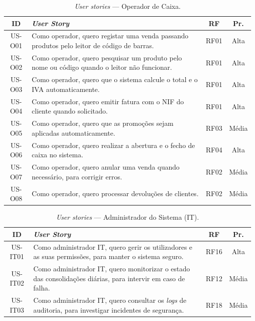    \begin{table}[H]
    \centering
    \small
    \begin{tabular}{|c|p{8.5cm}|c|c|}
    \hline
    \textbf{ID} & \textbf{\textit{User Story}} & \textbf{RF} & \textbf{Pr.} \\
    \hline
    US-O01 & Como operador, quero registar uma venda passando produtos pelo leitor de código de barras. & RF01 & Alta \\
    \hline
    US-O02 & Como operador, quero pesquisar um produto pelo nome ou código quando o leitor não funcionar. & RF01 & Alta \\
    \hline
    US-O03 & Como operador, quero que o sistema calcule o total e o IVA automaticamente. & RF01 & Alta \\
    \hline
    US-O04 & Como operador, quero emitir fatura com o NIF do cliente quando solicitado. & RF01 & Alta \\
    \hline
    US-O05 & Como operador, quero que as promoções sejam aplicadas automaticamente. & RF03 & Média \\
    \hline
    US-O06 & Como operador, quero realizar a abertura e o fecho de caixa no sistema. & RF04 & Alta \\
    \hline
    US-O07 & Como operador, quero anular uma venda quando necessário, para corrigir erros. & RF02 & Média \\
    \hline
    US-O08 & Como operador, quero processar devoluções de clientes. & RF02 & Média \\
    \hline
    \end{tabular}
    \caption{\textit{User stories} --- Operador de Caixa.}
    \label{tab:us_operador}
    \end{table}

    \begin{table}[H]
    \centering
    \small
    \begin{tabular}{|c|p{8.5cm}|c|c|}
    \hline
    \textbf{ID} & \textbf{\textit{User Story}} & \textbf{RF} & \textbf{Pr.} \\
    \hline
    US-IT01 & Como administrador IT, quero gerir os utilizadores e as suas permissões, para manter o sistema seguro. & RF16 & Alta \\
    \hline
    US-IT02 & Como administrador IT, quero monitorizar o estado das consolidações diárias, para intervir em caso de falha. & RF12 & Média \\
    \hline
    US-IT03 & Como administrador IT, quero consultar os \textit{logs} de auditoria, para investigar incidentes de segurança. & RF18 & Média \\
    \hline
    \end{tabular}
    \caption{\textit{User stories} --- Administrador do Sistema (IT).}
    \label{tab:us_it}
    \end{table}

